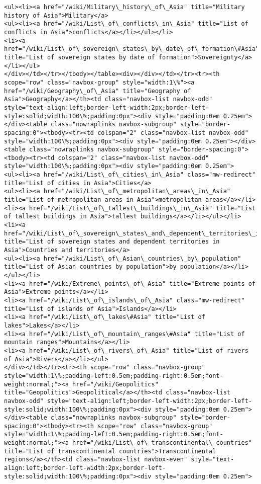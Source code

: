 \documentclass[11pt]{article}
\begin{document}
\begin{Verbatim}[commandchars=\\\{\}]
<ul><li><a href="/wiki/Military\_history\_of\_Asia" title="Military history of Asia">Military</a>
<ul><li><a href="/wiki/List\_of\_conflicts\_in\_Asia" title="List of conflicts in Asia">conflicts</a></li></ul></li>
<li><a href="/wiki/List\_of\_sovereign\_states\_by\_date\_of\_formation\#Asia" title="List of sovereign states by date of formation">Sovereignty</a></li></ul>
</div></td></tr></tbody></table><div></div></td></tr><tr><th scope="row" class="navbox-group" style="width:1\%"><a href="/wiki/Geography\_of\_Asia" title="Geography of Asia">Geography</a></th><td class="navbox-list navbox-odd" style="text-align:left;border-left-width:2px;border-left-style:solid;width:100\%;padding:0px"><div style="padding:0em 0.25em"></div><table class="nowraplinks navbox-subgroup" style="border-spacing:0"><tbody><tr><td colspan="2" class="navbox-list navbox-odd" style="width:100\%;padding:0px"><div style="padding:0em 0.25em"></div><table class="nowraplinks navbox-subgroup" style="border-spacing:0"><tbody><tr><td colspan="2" class="navbox-list navbox-odd" style="width:100\%;padding:0px"><div style="padding:0em 0.25em">
<ul><li><a href="/wiki/List\_of\_cities\_in\_Asia" class="mw-redirect" title="List of cities in Asia">Cities</a>
<ul><li><a href="/wiki/List\_of\_metropolitan\_areas\_in\_Asia" title="List of metropolitan areas in Asia">metropolitan areas</a></li>
<li><a href="/wiki/List\_of\_tallest\_buildings\_in\_Asia" title="List of tallest buildings in Asia">tallest buildings</a></li></ul></li>
<li><a href="/wiki/List\_of\_sovereign\_states\_and\_dependent\_territories\_in\_Asia" title="List of sovereign states and dependent territories in Asia">Countries and territories</a>
<ul><li><a href="/wiki/List\_of\_Asian\_countries\_by\_population" title="List of Asian countries by population">by population</a></li></ul></li>
<li><a href="/wiki/Extreme\_points\_of\_Asia" title="Extreme points of Asia">Extreme points</a></li>
<li><a href="/wiki/List\_of\_islands\_of\_Asia" class="mw-redirect" title="List of islands of Asia">Islands</a></li>
<li><a href="/wiki/List\_of\_lakes\#Asia" title="List of lakes">Lakes</a></li>
<li><a href="/wiki/List\_of\_mountain\_ranges\#Asia" title="List of mountain ranges">Mountains</a></li>
<li><a href="/wiki/List\_of\_rivers\_of\_Asia" title="List of rivers of Asia">Rivers</a></li></ul>
</div></td></tr><tr><th scope="row" class="navbox-group" style="width:1\%;padding-left:0.5em;padding-right:0.5em;font-weight:normal;"><a href="/wiki/Geopolitics" title="Geopolitics">Geopolitical</a></th><td class="navbox-list navbox-odd" style="text-align:left;border-left-width:2px;border-left-style:solid;width:100\%;padding:0px"><div style="padding:0em 0.25em"></div><table class="nowraplinks navbox-subgroup" style="border-spacing:0"><tbody><tr><th scope="row" class="navbox-group" style="width:1\%;padding-left:0.5em;padding-right:0.5em;font-weight:normal;"><a href="/wiki/List\_of\_transcontinental\_countries" title="List of transcontinental countries">Transcontinental regions</a></th><td class="navbox-list navbox-even" style="text-align:left;border-left-width:2px;border-left-style:solid;width:100\%;padding:0px"><div style="padding:0em 0.25em">

\end{Verbatim}
\end{document}
